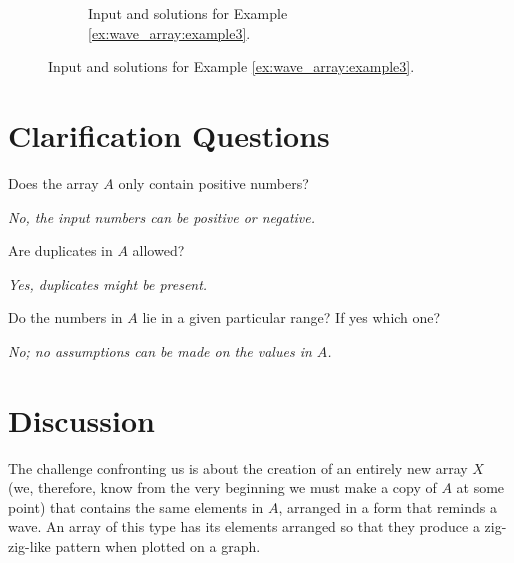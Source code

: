 \begin{figure}
\begin{subfigure}[t]{0.80\textwidth}
		 \caption{Input and solutions for Example \ref{ex:wave_array:example3}.}
		 \label{fig:wave_array:example13}
	  \end{subfigure}
\end{figure}


\section{Clarification Questions}

\begin{QandA}
	\item \begin{questionitem} \begin{question} Does the array $A$ only contain positive numbers?  \end{question} 	 
    \begin{answered}
		\textit{No, the input numbers can be positive or negative.}
	\end{answered} \end{questionitem}
	\item \begin{questionitem} \begin{question} Are duplicates in $A$ allowed?  \end{question} 	 
    \begin{answered}
		\textit{Yes, duplicates might be present.}
	\end{answered} \end{questionitem}
	\item \begin{questionitem} \begin{question} Do the numbers in $A$ lie in a given particular range? If yes which one?  \end{question} 	 
    \begin{answered}
		\textit{No; no assumptions can be made on the values in $A$.}
	\end{answered} \end{questionitem}
\end{QandA}

\section{Discussion}
\label{wave_array:sec:discussion}
The challenge confronting us is about the creation of an entirely new array $X$ (we, therefore, know from the very beginning we must make a copy of $A$ at some point) that contains the same elements in $A$, arranged in a form that reminds a wave. 
An array of this type has its elements arranged so that they produce a zig-zig-like pattern when plotted on a graph. 

